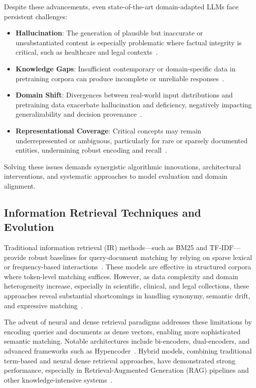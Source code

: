Despite these advancements, even state-of-the-art domain-adapted LLMs face persistent challenges:

\begin{itemize}
  \item \textbf{Hallucination}: The generation of plausible but inaccurate or unsubstantiated content is especially problematic where factual integrity is critical, such as healthcare and legal contexts~\cite{ref7,ref20,ref46,ref52,ref54,ref63,ref64}.
  \item \textbf{Knowledge Gaps}: Insufficient contemporary or domain-specific data in pretraining corpora can produce incomplete or unreliable responses~\cite{ref7,ref20,ref54,ref64}.
  \item \textbf{Domain Shift}: Divergences between real-world input distributions and pretraining data exacerbate hallucination and deficiency, negatively impacting generalizability and decision provenance~\cite{ref7,ref63,ref64}.
  \item \textbf{Representational Coverage}: Critical concepts may remain underrepresented or ambiguous, particularly for rare or sparsely documented entities, undermining robust encoding and recall~\cite{ref20,ref46,ref63}.
\end{itemize}

Solving these issues demands synergistic algorithmic innovations, architectural interventions, and systematic approaches to model evaluation and domain alignment.

\subsection{Information Retrieval Techniques and Evolution}

Traditional information retrieval (IR) methods---such as BM25 and TF-IDF---provide robust baselines for query-document matching by relying on sparse lexical or frequency-based interactions~\cite{ref42,ref44,ref52}. These models are effective in structured corpora where token-level matching suffices. However, as data complexity and domain heterogeneity increase, especially in scientific, clinical, and legal collections, these approaches reveal substantial shortcomings in handling synonymy, semantic drift, and expressive matching~\cite{ref43,ref44,ref52}.

The advent of neural and dense retrieval paradigms addresses these limitations by encoding queries and documents as dense vectors, enabling more sophisticated semantic matching. Notable architectures include bi-encoders, dual-encoders, and advanced frameworks such as Hypencoder~\cite{ref4,ref5,ref8,ref10,ref14,ref15,ref16,ref17,ref22,ref26,ref28,ref36,ref37,ref38,ref43,ref52,ref54,ref55}. Hybrid models, combining traditional term-based and neural dense retrieval approaches, have demonstrated strong performance, especially in Retrieval-Augmented Generation (RAG) pipelines and other knowledge-intensive systems~\cite{ref42,ref43,ref52,ref54}.

